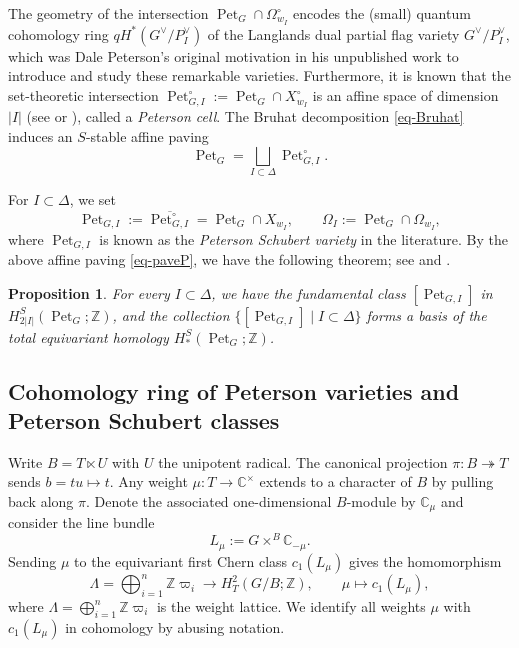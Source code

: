\documentclass[11pt, letterpaper]{amsart}
\numberwithin{equation}{section}
\newtheorem{proposition}[theorem]{Proposition}
\DeclareMathOperator{\Pet}{Pet}
\begin{document}
The geometry of the intersection $\Pet_G  \cap \Omega_{w_{I}}^\circ$ encodes the (small) quantum cohomology ring $qH^*(G^{\vee} / P_I^{\vee})$ of the Langlands dual partial flag variety $G^{\vee} / P_I^{\vee}$, which was Dale Peterson's original motivation in his unpublished work \cite{peterson1997quantum} to introduce and study these remarkable varieties. Furthermore, it is known that the set-theoretic intersection $\Pet_{G,I}^{\circ}:=\Pet_G \cap X_{w_I}^\circ$ is an affine space of dimension $|I|$ (see \cite{tymoczko2007paving} or \cite{Bualibanu2017Peterson}), called a \emph{Peterson cell}. The Bruhat decomposition \eqref{eq-Bruhat} induces an $S$-stable affine paving 
\begin{equation} \label{eq-paveP}
\Pet_{G}=\bigsqcup_{I \subset \Delta} \Pet_{G, I}^{\circ}.
\end{equation}

For $I\subset\Delta$, we set
\begin{equation} \label{eq-PSV}
  \Pet_{G, I}:=\overline{\Pet_{G, I}^{\circ}}=\Pet_{G} \cap X_{w_{I}},\qquad
\Omega_{I}:=\Pet_{G} \cap\Omega_{w_{I}},  
\end{equation}
where $\Pet_{G, I}$ is known as the \emph{Peterson Schubert variety} in the literature.
By the above affine paving \eqref{eq-paveP}, we have the following theorem; see \cite{peterson1997quantum} and \cite{tymoczko2007paving}.

\begin{proposition}
For every $I\subset\Delta$, we have the fundamental class $[\Pet_{G,I}]$ in $H^S_{2|I|}(\Pet_{G};\mathbb{Z})$, and the collection
$\{[\Pet_{G,I}]\mid I\subset\Delta\}$ forms a basis of the total equivariant homology $H^S_{*}(\Pet_{G};\mathbb{Z})$.
\end{proposition}

\subsection{Cohomology ring of Peterson varieties and Peterson Schubert classes} \label{sec-pre-Cohomology}

Write $B=T\ltimes U$ with $U$ the unipotent radical. The canonical projection $\pi\colon B\twoheadrightarrow T$ sends $b=tu\mapsto t$.  Any weight $\mu\colon T\to\mathbb{C}^{\times}$ extends to a character of $B$ by pulling back along $\pi$. Denote the associated one-dimensional $B$-module by $\mathbb{C}_{\mu}$ and consider the line bundle
\[
L_{\mu}:=G\times^{B}\mathbb{C}_{-\mu}.
\]
Sending $\mu$ to the equivariant first Chern class $c_{1}(L_{\mu})$ gives the homomorphism
\[
\Lambda=\bigoplus_{i=1}^{n}\mathbb{Z}\varpi_{i}\rightarrow
H_T^{2}(G/B;\mathbb{Z}),
\qquad \mu\longmapsto c_{1}(L_{\mu}),
\]
where $\Lambda=\bigoplus_{i=1}^{n}\mathbb{Z}\varpi_{i}$ is the weight lattice. We identify all weights $\mu$ with $c_{1}(L_{\mu})$ in cohomology by abusing notation. 
\end{document}
